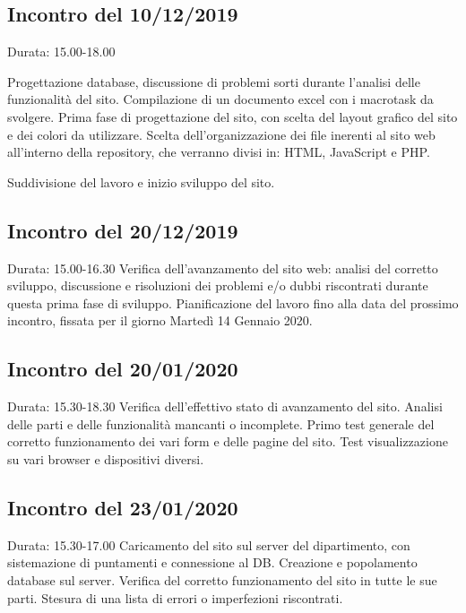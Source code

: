 \subsection{Incontro del 10/12/2019}
    Durata: 15.00-18.00

    Progettazione database, discussione di problemi sorti durante l'analisi delle funzionalità del sito. Compilazione di un documento excel con i macrotask da svolgere.
    Prima fase di progettazione del sito, con scelta del layout grafico del sito e dei colori da utilizzare.
    Scelta dell'organizzazione dei file inerenti al sito web all'interno della repository, che verranno divisi in: HTML, JavaScript e PHP.

    Suddivisione del lavoro e inizio sviluppo del sito.

\subsection{Incontro del 20/12/2019}
    Durata: 15.00-16.30
    Verifica dell'avanzamento del sito web: analisi del corretto sviluppo, discussione e risoluzioni dei problemi e/o dubbi riscontrati durante questa prima fase di sviluppo.
    Pianificazione del lavoro fino alla data del prossimo incontro, fissata per il giorno Martedì 14 Gennaio 2020.

\subsection{Incontro del 20/01/2020}
    Durata: 15.30-18.30
    Verifica dell'effettivo stato di avanzamento del sito. Analisi delle parti e delle funzionalità mancanti o incomplete.
    Primo test generale del corretto funzionamento dei vari form e delle pagine del sito.
    Test visualizzazione su vari browser e dispositivi diversi.

\subsection{Incontro del 23/01/2020}
    Durata: 15.30-17.00
    Caricamento del sito sul server del dipartimento, con sistemazione di puntamenti e connessione al DB. Creazione e popolamento database sul server.
    Verifica del corretto funzionamento del sito in tutte le sue parti. Stesura di una lista di errori o imperfezioni riscontrati.




